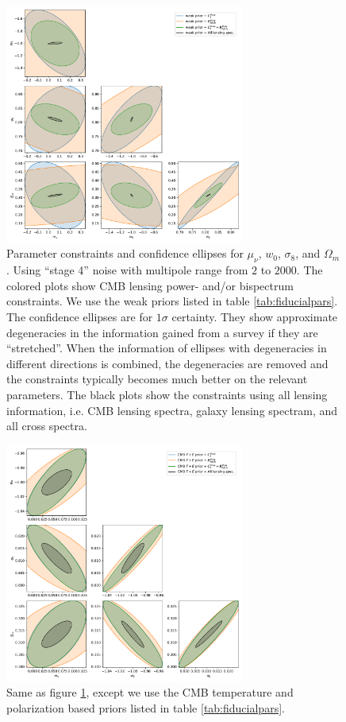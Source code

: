 \documentclass[11pt]{article} %
\begin{document}
\begin{figure}
    \centering
    \includegraphics[width=0.7\textwidth]{figures/param_constraints_tight_cmb_weak_prior.pdf}
    \caption{Parameter constraints and confidence ellipses for $\mu_\nu$, $w_0$, $\sigma_8$, and $\Omega_m$. Using ``stage 4'' noise with multipole range from $2$ to $2000$. The colored plots show CMB lensing power- and/or bispectrum constraints. We use the weak priors listed in table \ref{tab:fiducialpars}. The confidence ellipses are for $1\sigma$ certainty. They show approximate degeneracies in the information gained from a survey if they are ``stretched''. When the information of ellipses with degeneracies in different directions is combined, the degeneracies are removed and the constraints typically becomes much better on the relevant parameters. The black plots show the constraints using all lensing information, i.e. CMB lensing spectra, galaxy lensing spectram, and all cross spectra.}
    \label{fig:paramconstraintstightcmb}
\end{figure}

\begin{figure}
    \centering
    \includegraphics[width=0.7\textwidth]{figures/param_constraints_tight_cmb_cmb_prior.pdf}
    \caption{Same as figure \ref{fig:paramconstraintstightcmb}, except we use the CMB temperature and polarization based priors listed in table \ref{tab:fiducialpars}.}
    \label{fig:paramconstraintstightcmbcmbprior}
\end{figure}
\end{document}

